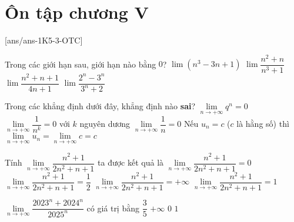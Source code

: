 \section{Ôn tập chương V}
[ans/ans-1K5-3-OTC]
\begin{ex}%
	Trong các giới hạn sau, giới hạn nào bằng $ 0 $?
	\choice
	{$ \lim(n^3-3n+1) $}
	{\True $ \lim\dfrac{n^2+n}{n^3+1} $}
	{$ \lim\dfrac{n^2+n+1}{4n+1} $}
	{$ \lim\dfrac{2^n-3^n}{3^n+2} $}
\end{ex}
\begin{ex}%
	Trong các khẳng định dưới đây, khẳng định nào \textbf{sai}?
	\choice
	{\True $\lim\limits_{n \to +\infty} q^n=0$}
	{$\lim\limits_{n \to +\infty} \dfrac{1}{n^k}=0$ với $k$ nguyên dương}
	{$\lim\limits_{n \to +\infty} \dfrac{1}{n}=0$}
	{Nếu $u_n=c$ ($c$ là hằng số) thì $\lim\limits_{n \to +\infty} u_n=\lim \limits_{n \to +\infty}c=c$}
\end{ex}

\begin{ex}%
	Tính $\lim \limits_{n \to +\infty}\dfrac{n^2+1}{2n^2+n+1}$ ta được kết quả là
	\choice
	{$\lim \limits_{n \to +\infty}\dfrac{n^2+1}{2n^2+n+1}=0$}
	{\True $\lim \limits_{n \to +\infty}\dfrac{n^2+1}{2n^2+n+1}=\dfrac{1}{2}$}
	{$\lim \limits_{n \to +\infty}\dfrac{n^2+1}{2n^2+n+1}=+\infty $}
	{$\lim \limits_{n \to +\infty}\dfrac{n^2+1}{2n^2+n+1}=1$}
\end{ex}

\begin{ex}%
	$\lim \limits_{n \to +\infty}\dfrac{2023^n+2024^n}{2025^n}$ có giá trị bằng
	\choice
	{$\dfrac{3}{5}$}
	{$+\infty$}
	{\True $0$}
	{$1$}
\end{ex}

